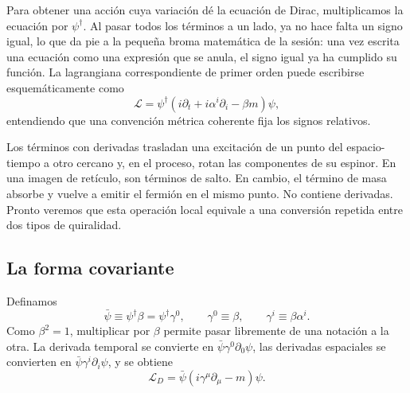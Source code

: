 Para obtener una acción cuya variación dé la ecuación de Dirac, multiplicamos la ecuación por \(\psi^\dagger\). Al pasar todos los términos a un lado, ya no hace falta un signo igual, lo que da pie a la pequeña broma matemática de la sesión: una vez escrita una ecuación como una expresión que se anula, el signo igual ya ha cumplido su función. La lagrangiana correspondiente de primer orden puede escribirse esquemáticamente como
\begin{equation}
  \mathcal L
  =
  \psi^\dagger
  \left(i\partial_t+i\alpha^i\partial_i-\beta m\right)\psi ,
  \label{eq:l10-dirac-old-lagrangian}
\end{equation}
entendiendo que una convención métrica coherente fija los signos relativos.

Los términos con derivadas trasladan una excitación de un punto del espacio-tiempo a otro cercano y, en el proceso, rotan las componentes de su espinor. En una imagen de retículo, son términos de salto. En cambio, el término de masa absorbe y vuelve a emitir el fermión en el mismo punto. No contiene derivadas. Pronto veremos que esta operación local equivale a una conversión repetida entre dos tipos de quiralidad.

\begin{classroomqa}
\end{classroomqa}

\subsection{La forma covariante}

Definamos
\begin{equation}
  \bar\psi\equiv\psi^\dagger\beta
  =\psi^\dagger\gamma^0,
  \qquad
  \gamma^0\equiv\beta,
  \qquad
  \gamma^i\equiv\beta\alpha^i .
  \label{eq:l10-dirac-adjoint}
\end{equation}
Como \(\beta^2=1\), multiplicar por \(\beta\) permite pasar libremente de una notación a la otra. La derivada temporal se convierte en
\(\bar\psi\gamma^0\partial_0\psi\), las derivadas espaciales se convierten en
\(\bar\psi\gamma^i\partial_i\psi\), y se obtiene
\begin{equation}
  \boxed{\mathcal L_D
  =\bar\psi\left(i\gamma^\mu\partial_\mu-m\right)\psi .}
  \label{eq:l10-covariant-dirac}
\end{equation}

